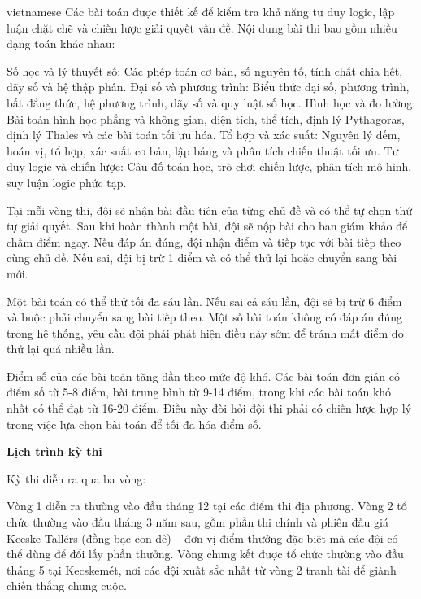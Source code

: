 \documentclass{article}
\begin{document}
\begin{otherlanguage*}{vietnamese}
Các bài toán được thiết kế để kiểm tra khả năng tư duy logic, lập luận chặt chẽ và chiến lược giải quyết vấn đề. Nội dung bài thi bao gồm nhiều dạng toán khác nhau:
\begin{itemize}[topsep=0pt, partopsep=0pt, itemsep=0pt]
    \ii Số học và lý thuyết số: Các phép toán cơ bản, số nguyên tố, tính chất chia hết, dãy số và hệ thập phân.
    \ii Đại số và phương trình: Biểu thức đại số, phương trình, bất đẳng thức, hệ phương trình, dãy số và quy luật số học.
    \ii Hình học và đo lường: Bài toán hình học phẳng và không gian, diện tích, thể tích, định lý Pythagoras, định lý Thales và các bài toán tối ưu hóa.
    \ii Tổ hợp và xác suất: Nguyên lý đếm, hoán vị, tổ hợp, xác suất cơ bản, lập bảng và phân tích chiến thuật tối ưu.
    \ii Tư duy logic và chiến lược: Câu đố toán học, trò chơi chiến lược, phân tích mô hình, suy luận logic phức tạp.
\end{itemize}

Tại mỗi vòng thi, đội sẽ nhận bài đầu tiên của từng chủ đề và có thể tự chọn thứ tự giải quyết. Sau khi hoàn thành một bài, đội sẽ nộp bài cho ban giám khảo để chấm điểm ngay.
Nếu đáp án đúng, đội nhận điểm và tiếp tục với bài tiếp theo cùng chủ đề. Nếu sai, đội bị trừ 1 điểm và có thể thử lại hoặc chuyển sang bài mới.

Một bài toán có thể thử tối đa sáu lần. Nếu sai cả sáu lần, đội sẽ bị trừ 6 điểm và buộc phải chuyển sang bài tiếp theo.
Một số bài toán không có đáp án đúng trong hệ thống, yêu cầu đội phải phát hiện điều này sớm để tránh mất điểm do thử lại quá nhiều lần.

Điểm số của các bài toán tăng dần theo mức độ khó. Các bài toán đơn giản có điểm số từ 5-8 điểm, bài trung bình từ 9-14 điểm,
trong khi các bài toán khó nhất có thể đạt từ 16-20 điểm. Điều này đòi hỏi đội thi phải có chiến lược hợp lý trong việc lựa chọn bài toán để tối đa hóa điểm số.

\textbf{Lịch trình kỳ thi}

Kỳ thi diễn ra qua ba vòng:
\begin{enumerate}[topsep=0pt, partopsep=0pt, itemsep=0pt]
    \ii Vòng 1 diễn ra thường vào đầu tháng 12 tại các điểm thi địa phương.
    \ii Vòng 2 tổ chức thường vào đầu tháng 3 năm sau,
    gồm phần thi chính và phiên đấu giá Kecske Tallérs (đồng bạc con dê) – đơn vị điểm thưởng đặc biệt mà các đội có thể dùng để đổi lấy phần thưởng.
    \ii Vòng chung kết được tổ chức thường vào đầu tháng 5 tại Kecskemét, nơi các đội xuất sắc nhất từ vòng 2 tranh tài để giành chiến thắng chung cuộc.
\end{enumerate}


\end{otherlanguage*}
\end{document}
